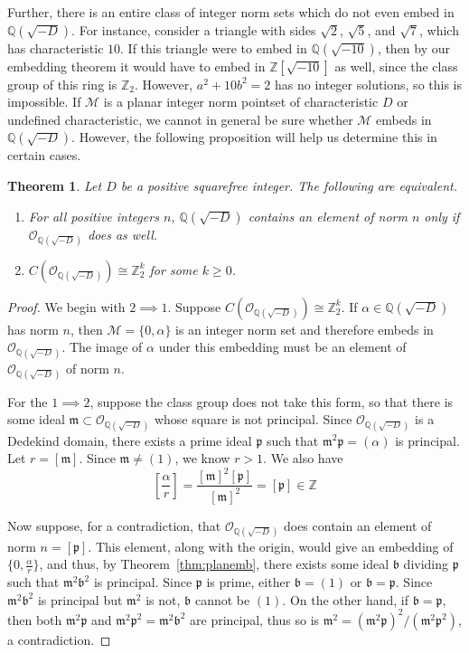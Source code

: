 \documentclass[10pt]{amsart}
\newcommand{\M}{\mathcal{M}}
\newcommand{\Q}{\mathbb{Q}}
\newcommand{\Z}{\mathbb{Z}}
\newcommand{\p}{\mathfrak{p}}
\renewcommand{\b}{\mathfrak{b}}
\newcommand{\m}{\mathfrak{m}}
\newcommand{\thefield}{\Q(\sqrt{-D})}
\newcommand{\thering}{\mathcal{O}_{\Q(\sqrt{-D})}}
\newcommand{\norm}[1]{\left[#1\right]}
\newtheorem{thm}{Theorem}
\begin{document}
Further, there is an entire class of integer norm sets which do not even embed in $\Q(\sqrt{-D})$.  For instance, consider a triangle with sides $\sqrt{2}$, $\sqrt{5}$, and $\sqrt{7}$, which has characteristic $10$.  If this triangle were to embed in $\Q(\sqrt{-10})$, then by our embedding theorem it would have to embed in $\Z[\sqrt{-10}]$ as well, since the class group of this ring is $\Z_2$.  However, $a^2+10b^2 = 2$ has no integer solutions, so this is impossible.  If $\M$ is a planar integer norm pointset of characteristic $D$ or undefined characteristic, we cannot in general be sure whether $\M$ embeds in $\Q(\sqrt{-D})$.  However, the following proposition will help us determine this in certain cases.

\begin{thm}
\normalfont
Let $D$ be a positive squarefree integer.  The following are equivalent.
\begin{enumerate}
\item For all positive integers $n$, $\thefield$ contains an element of norm $n$ only if $\thering$ does as well.
\item $C(\thering) \cong \Z_2^k$ for some $k \geq 0$.
\end{enumerate}
\end{thm}
\begin{proof}
We begin with $2 \implies 1$.  Suppose $C(\thering) \cong \Z_2^k$.  If $\alpha \in \thefield$ has norm $n$, then $\M = \{0,\alpha \}$ is an integer norm set and therefore embeds in $\thering$.  The image of $\alpha$ under this embedding must be an element of $\thering$ of norm $n$.

For the $1 \implies 2$, suppose the class group does not take this form, so that there is some ideal $\m \subset \thering$ whose square is not principal.  Since $\thering$ is a Dedekind domain, there exists a prime ideal $\p$ such that $\m^2\p = (\alpha)$ is principal.  Let $r = \norm{\m}$.  Since $\m \neq (1)$, we know $r > 1$.  We also have
$$
\norm{\frac{\alpha}{r}} = \frac{\norm{\m}^2\norm{\p}}{\norm{\m}^2} = \norm{\p} \in \Z
$$

Now suppose, for a contradiction, that $\thering$ does contain an element of norm $n = \norm{\p}$.  This element, along with the origin, would give an embedding of $\{0,\frac{\alpha}{r}\}$, and thus, by Theorem~\ref{thm:planemb}, there exists some ideal $\b$ dividing $\p$ such that $\m^2\b^2$ is principal.  Since $\p$ is prime, either $\b = (1)$ or $\b = \p$.  Since $\m^2\b^2$ is principal but $\m^2$ is not, $\b$ cannot be $(1)$.  On the other hand, if $\b = \p$, then both $\m^2\p$ and $\m^2\p^2 = \m^2\b^2$ are principal, thus so is $\m^2 = (\m^2\p)^2 / (\m^2\p^2)$, a contradiction.
\end{proof}
\end{document}
